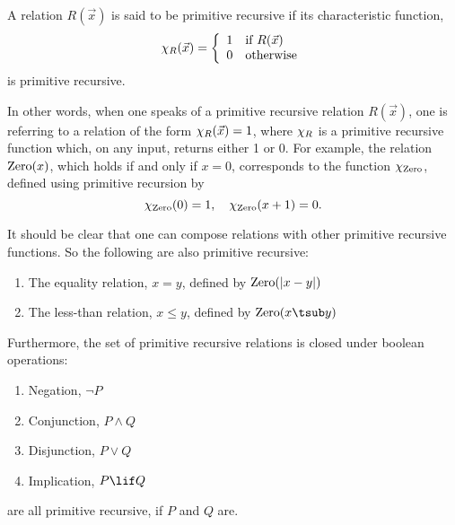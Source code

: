 \documentclass[../../include/open-logic-section]{subfiles}
\begin{document}


\begin{defn}
A relation $R(\vec x)$ is said to be primitive recursive if its characteristic
function,
\[
\Char{R}(\vec x) = \left\{
  \begin{array}{ll}
  1 & \mbox{if $R(\vec x)$} \\
  0 & \mbox{otherwise}
  \end{array}
\right.
\]
is primitive recursive.
\end{defn}

In other words, when one speaks of a primitive
recursive relation $R(\vec x)$, one is referring to a relation of the
form $\chi_{R}(\vec x) = 1$, where $\chi_{R}$ is a primitive recursive
function which, on any input, returns either 1 or 0. For example, the
relation $\mathrm{Zero}(x)$, which holds if and only if $x = 0$,
corresponds to the function $\chi_{\mathrm{Zero}}$, defined using primitive
recursion by
\[
\chi_{\mathrm{Zero}}(0) = 1, \quad \chi_{\mathrm{Zero}}(x+1) = 0.
\]

It should be clear that one can compose relations with other primitive
recursive functions. So the following are also primitive recursive:
\begin{enumerate}
\item The equality relation, $x = y$, defined by $\mathrm{Zero}(\left|x -
  y\right|)$
\item The less-than relation, $x \leq y$, defined by $\fn{Zero}(x
  \tsub y)$
\end{enumerate}
Furthermore, the set of primitive recursive relations is closed under
boolean operations:
\begin{enumerate}
\item Negation, $\lnot P$
\item Conjunction, $P \land Q$
\item Disjunction, $P \lor Q$
\item Implication, $P \lif Q$
\end{enumerate}
are all primitive recursive, if $P$ and $Q$ are.
\end{document}
